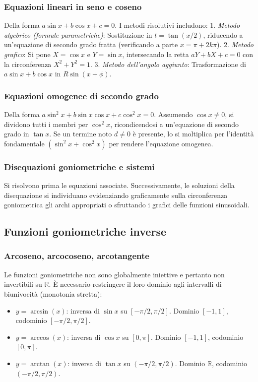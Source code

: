 \subsubsection{Equazioni lineari in seno e coseno}
Della forma $a\sin x + b\cos x + c = 0$. I metodi risolutivi includono:
1. \textit{Metodo algebrico (formule parametriche)}: Sostituzione in $t=\tan(x/2)$, riducendo a un'equazione di secondo grado fratta (verificando a parte $x = \pi + 2k\pi$).
2. \textit{Metodo grafico}: Si pone $X=\cos x$ e $Y=\sin x$, intersecando la retta $aY + bX + c = 0$ con la circonferenza $X^2+Y^2=1$.
3. \textit{Metodo dell'angolo aggiunto}: Trasformazione di $a\sin x + b\cos x$ in $R\sin(x+\phi)$.

\subsubsection{Equazioni omogenee di secondo grado}
Della forma $a\sin^2 x + b\sin x\cos x + c\cos^2 x = 0$. Assumendo $\cos x \neq 0$, si dividono tutti i membri per $\cos^2 x$, ricondicendosi a un'equazione di secondo grado in $\tan x$. Se un termine noto $d \neq 0$ è presente, lo si moltiplica per l'identità fondamentale $(\sin^2 x + \cos^2 x)$ per rendere l'equazione omogenea.

\subsubsection{Disequazioni goniometriche e sistemi}
Si risolvono prima le equazioni associate. Successivamente, le soluzioni della disequazione si individuano evidenziando graficamente sulla circonferenza goniometrica gli archi appropriati o sfruttando i grafici delle funzioni sinusoidali.

\subsection{Funzioni goniometriche inverse}
\subsubsection{Arcoseno, arcocoseno, arcotangente}
Le funzioni goniometriche non sono globalmente iniettive e pertanto non invertibili su $\mathbb{R}$. È necessario restringere il loro dominio agli intervalli di biunivocità (monotonia stretta):
\begin{itemize}
    \item $y = \arcsin(x)$: inversa di $\sin x$ su $[-\pi/2, \pi/2]$. Dominio $[-1,1]$, codominio $[-\pi/2, \pi/2]$.
    \item $y = \arccos(x)$: inversa di $\cos x$ su $[0, \pi]$. Dominio $[-1,1]$, codominio $[0, \pi]$.
    \item $y = \arctan(x)$: inversa di $\tan x$ su $(-\pi/2, \pi/2)$. Dominio $\mathbb{R}$, codominio $(-\pi/2, \pi/2)$.
\end{itemize}

